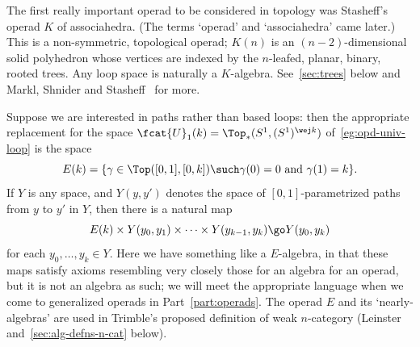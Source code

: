 \begin{example}	
The first really important operad to be considered in topology was
Stasheff's~\cite{StaHAHI}%
%
%
operad $K$%
% 
% 
of associahedra.%
%
%
 (The terms `operad'
and `associahedra' came later.)  This is a non-symmetric, topological
operad; $K(n)$ is an $(n-2)$-dimensional solid polyhedron whose vertices
are indexed by the $n$-leafed, planar, binary, rooted trees.  Any loop
space is naturally a $K$-algebra.  See~\ref{sec:trees} below and Markl,
Shnider and Stasheff~\cite{MSS} for more.
\end{example}

\begin{example}	%
%
%
%
%
Suppose we are interested in paths%
%
%
rather than based loops: then the
appropriate replacement for the space $\fcat{U}_1(k) = \Top_*(S^1,
(S^1)^{\wej k})$ of~\ref{eg:opd-univ-loop} is the space
\[
E(k) = 
\{ \gamma \in \Top([0,1], [0,k]) \such
\gamma(0) = 0 \textrm{ and } \gamma(1) = k \}.
\]
If $Y$ is any space, and $Y(y, y')$ denotes the space of
$[0,1]$-parametrized paths from $y$ to $y'$ in $Y$, then there is a natural
map 
\[
E(k) \times Y(y_0, y_1) \times\cdots\times Y(y_{k-1}, y_k)
\go
Y(y_0, y_k)
\]
for each $y_0, \ldots, y_k \in Y$.  Here we have something like a
$E$-algebra, in that these maps satisfy axioms resembling very closely
those for an algebra for an operad, but it is not an algebra as such; we
will meet the appropriate language when we come to generalized operads in
Part~\ref{part:operads}.  The operad $E$ and its `nearly-algebras' are used
in Trimble's%
%
%
proposed definition of weak $n$-category
(Leinster~\cite{SDN} and~\ref{sec:alg-defns-n-cat} below).
\end{example}%
%
%

